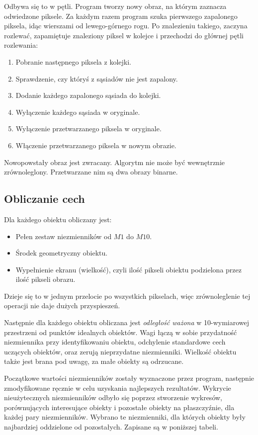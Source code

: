 \documentclass[a4paper,12pt]{article}
\begin{document}
			Odbywa się to w pętli.
			Program tworzy nowy obraz, na którym zaznacza odwiedzone piksele.
			Za każdym razem program szuka pierwszego zapalonego piksela, idąc wierszami od lewego-górnego rogu.
			Po znalezieniu takiego, zaczyna rozlewać, zapamiętuje znaleziony piksel w kolejce i przechodzi do głównej pętli rozlewania:
			\begin{enumerate}
				\item Pobranie następnego piksela z kolejki.
				\item Sprawdzenie, czy któryś z sąsiadów nie jest zapalony.
				\item Dodanie każdego zapalonego sąsiada do kolejki.
				\item Wyłączenie każdego sąsiada w oryginale.
				\item Wyłączenie przetwarzanego piksela w oryginale.
				\item Włączenie przetwarzanego piksela w nowym obrazie.
			\end{enumerate}

			Nowopowstały obraz jest zwracany.
			Algorytm nie może być wewnętrznie zrównoleglony.
			Przetwarzane nim są dwa obrazy binarne.
			
		\subsection{Obliczanie cech}
			Dla każdego obiektu obliczany jest:
			\begin{itemize}
				\item Pełen zestaw niezmienników od $M1$ do $M10$.
				\item Środek geometryczny obiektu.
				\item Wypełnienie ekranu (wielkość), czyli ilość pikseli obiektu podzielona przez ilość pikseli obrazu.
			\end{itemize}
			
			Dzieje się to w jednym przelocie po wszystkich pikselach, więc zrównoleglenie tej operacji nie daje dużych przyspieszeń.
			
			Następnie dla każdego obiektu obliczana jest \emph{odległość ważona} w 10-wymiarowej przestrzeni od punktów idealnych obiektów.
			Wagi łączą w sobie przydatność niezmiennika przy identyfikowaniu obiektu, odchylenie standardowe cech uczących obiektów, oraz zerują nieprzydatne niezmienniki.
			Wielkość obiektu także jest brana pod uwagę, za małe obiekty są odrzucane.
			
			Początkowe wartości niezmienników zostały wyznaczone przez program, następnie zmodyfikowane ręcznie w celu uzyskania najlepszych rezultatów.
			Wykrycie nieużytecznych niezmienników odbyło się poprzez stworzenie wykresów, porównujących interesujące obiekty i pozostałe obiekty na płaszczyźnie, dla każdej pary niezmienników. Wybrano te niezmienniki, dla których obiekty były najbardziej oddzielone od pozostałych.
			Zapisane są w poniższej tabeli.
			
\end{document}
